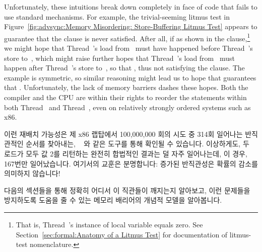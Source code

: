 Unfortunately, these intuitions break down completely in face of
code that fails to use standard mechanisms.
For example, the trivial-seeming litmus test in
Figure~\ref{fig:advsync:Memory Misordering: Store-Buffering Litmus Test}
appears to guarantee that the  clause is never satisfied.
After all, if  as shown in the  clause,\footnote{
	That is, Thread~'s instance of local variable 
	equals zero.
	See Section~\ref{sec:formal:Anatomy of a Litmus Test}
	for documentation of litmus-test nomenclature.}
we might hope that Thread~'s
load from~ must have happened before Thread~'s store to~,
which might raise
further hopes that Thread~'s load from~ must happen after
Thread~'s store to~, so that ,
thus not satisfying the  clause.
The example is symmetric, so similar reasoning might lead
us to hope that  guarantees that .
Unfortunately, the lack of memory barriers dashes these hopes.
Both the compiler and the CPU are within their rights to reorder
the statements within both Thread~ and Thread~,
even on relatively strongly ordered systems such as x86.
\fi

이런 재배치 가능성은 제 x86 랩탑에서 100,000,000 회의 시도 중 314회 일어나는
반직관적인 순서를 찾아내는,
~\cite{Alglave:2014:HCM:2594291.2594347} 와 같은 도구를 통해 확인될
수 있습니다.
이상하게도, 두 로드가 모두 값 2를 리턴하는 완전히 합법적인 결과는 덜 자주
일어나는데, 이 경우, 167번만 일어났습니다.
여기서의 교훈은 분명합니다: 증가된 반직관성은 확률의 감소를 의미하지 않습니다!

다음의 섹션들을 통해 정확히 어디서 이 직관들이 깨지는지 알아보고, 이런 문제들을
방지하도록 도움을 줄 수 있는 메모리 배리어의 개념적 모델을 알아봅니다.

